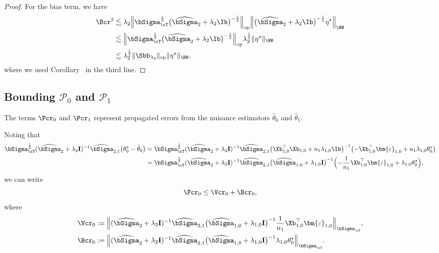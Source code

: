 \documentclass[12pt,a4paper,pdftex,onepage]{article}
\newcommand{\Sighat}{\widehat{{\bSigma}}}
\newcommand{\op}{\operatorname{op}}
\begin{document}
\begin{proof}
For the bias term, we have
\begin{align*}
\Bcr^2 
&\lesssim  \lambda_2\Bigl\| \bSigma_\cT^{\frac{1}{2}} \bigl(\Sighat_2 + \lambda_2 \Ib\bigr)^{-\frac{1}{2}}\Bigr\|_{\operatorname{op}} 
\Bigl\|\bigl(\Sighat_2 + \lambda_2 \Ib\bigr)^{-\frac{1}{2}} \eta^\star \Bigr\|_\HH \\
&\lesssim  \Bigl\| \bSigma_\cT^{\frac{1}{2}} \bigl(\Sighat_2 + \lambda_2 \Ib\bigr)^{-\frac{1}{2}}\Bigr\|_{\operatorname{op}} 
\lambda_2^{\frac{1}{2}} \|\eta^\star \|_{\HH} \\
&\lesssim \lambda_2^{\frac{1}{2}}  \|\Sbb_{\lambda_2}\|_{\op} \|\eta^\star\|_{\HH},
\end{align*}
where we used Corollary~ in the third line.
\end{proof}

\subsection{Bounding \(\mathscr{P}_0\) and \(\mathscr{P}_1\)}
\noindent
The terms \(\Pcr_0\) and \(\Pcr_1\) represent propagated errors from the nuisance estimators \(\hat{\theta}_0\) and \(\hat{\theta}_1\).

Noting that
\begin{align*}
\bSigma_{\cT}^{\frac{1}{2}} (\Sighat_2 + \lambda_2 \mathbf{I})^{-1} \Sighat_{2,1}\bigl({\theta}^\star_0-\hat{\theta}_0\bigr)
&= \bSigma_{\cT}^{\frac{1}{2}} (\Sighat_2 + \lambda_2 \mathbf{I})^{-1} \Sighat_{2,1}\bigl(\Xb_{1,0}^\top \Xb_{1,0}+n_{1}\lambda_{1,0} \Ib\bigr)
^{-1} \bigl(-\Xb_{1,0}^\top \bm{\varepsilon}_{1,0} + n_{1}\lambda_{1,0}\theta_0^\star\bigr) \\
&=  \bSigma_{\cT}^{\frac{1}{2}} (\Sighat_2 + \lambda_2 \mathbf{I})^{-1}  \Sighat_{2,1} \bigl(\Sighat_{1,0}+\lambda_{1,0} \mathbf{I}\bigr)
^{-1} \Bigl(-\frac{1}{n_1}\Xb_{1,0}^\top \bm{\varepsilon}_{1,0} + \lambda_{1,0}\theta_0^\star\Bigr),
\end{align*}
we can write
\[
\Pcr_0 \leq \Vcr_0 + \Bcr_0,
\]
where 
\begin{align*}
\Vcr_0 &:= \Bigl\|   (\Sighat_2 + \lambda_2 \mathbf{I})^{-1}  \Sighat_{2,1} \bigl(\Sighat_{1,0}+\lambda_{1,0} \mathbf{I}\bigr)
^{-1} \frac{1}{n_1}\Xb_{1,0}^\top \bm{\varepsilon}_{1,0} \Bigr\|_{\bSigma_{\cT}},\\
\Bcr_0 &:= \Bigl\| (\Sighat_2 + \lambda_2 \mathbf{I})^{-1}  \Sighat_{2,1} \bigl(\Sighat_{1,0}+\lambda_{1,0} \mathbf{I}\bigr)
^{-1} \lambda_{1,0}\theta_0^\star\Bigr\|_{\bSigma_{\cT}}.
\end{align*}
\end{document}
